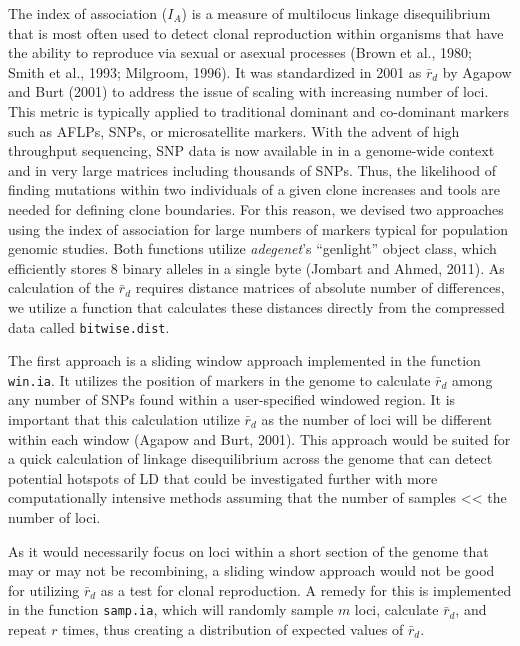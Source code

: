 \documentclass{frontiersSCNS} %
\begin{document}
The index of association (\(I_A\)) is a measure of multilocus linkage
disequilibrium that is most often used to detect clonal reproduction
within organisms that have the ability to reproduce via sexual or
asexual processes (Brown et al., 1980; Smith et al., 1993; Milgroom,
1996). It was standardized in 2001 as \(\bar{r}_d\) by Agapow and Burt
(2001) to address the issue of scaling with increasing number of loci.
This metric is typically applied to traditional dominant and co-dominant
markers such as AFLPs, SNPs, or microsatellite markers. With the advent
of high throughput sequencing, SNP data is now available in in a
genome-wide context and in very large matrices including thousands of
SNPs. Thus, the likelihood of finding mutations within two individuals
of a given clone increases and tools are needed for defining clone
boundaries. For this reason, we devised two approaches using the index
of association for large numbers of markers typical for population
genomic studies. Both functions utilize \emph{adegenet}'s ``genlight''
object class, which efficiently stores 8 binary alleles in a single byte
(Jombart and Ahmed, 2011). As calculation of the \(\bar{r}_d\) requires
distance matrices of absolute number of differences, we utilize a
function that calculates these distances directly from the compressed
data called \texttt{bitwise.dist}.

The first approach is a sliding window approach implemented in the
function \texttt{win.ia}. It utilizes the position of markers in the
genome to calculate \(\bar{r}_d\) among any number of SNPs found within
a user-specified windowed region. It is important that this calculation
utilize \(\bar{r}_d\) as the number of loci will be different within
each window (Agapow and Burt, 2001). This approach would be suited for a
quick calculation of linkage disequilibrium across the genome that can
detect potential hotspots of LD that could be investigated further with
more computationally intensive methods assuming that the number of
samples \textless{}\textless{} the number of loci.

As it would necessarily focus on loci within a short section of the
genome that may or may not be recombining, a sliding window approach
would not be good for utilizing \(\bar{r}_d\) as a test for clonal
reproduction. A remedy for this is implemented in the function
\texttt{samp.ia}, which will randomly sample \(m\) loci, calculate
\(\bar{r}_d\), and repeat \(r\) times, thus creating a distribution of
expected values of \(\bar{r}_d\).
\end{document}

